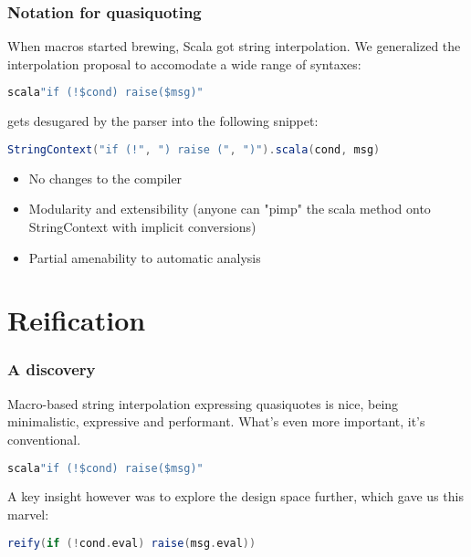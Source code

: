 \documentclass[hyperref={bookmarks=false}]{beamer}
\begin{document}
\begin{frame}[fragile]
\frametitle{Notation for quasiquoting}

When macros started brewing, Scala got string interpolation. We generalized the interpolation proposal to accomodate a wide range of syntaxes:

\begin{lstlisting}[language=scala]
scala"if (!$cond) raise($msg)"
\end{lstlisting}

gets desugared by the parser into the following snippet:

\begin{lstlisting}[language=scala]
StringContext("if (!", ") raise (", ")").scala(cond, msg)
\end{lstlisting}

\begin{itemize}
\item No changes to the compiler
\item Modularity and extensibility (anyone can "pimp" the scala method onto StringContext with implicit conversions)
\item Partial amenability to automatic analysis
\end{itemize}
\end{frame}

\section{Reification}

\begin{frame}[fragile]
\frametitle{A discovery}

Macro-based string interpolation expressing quasiquotes is nice, being minimalistic, expressive and performant. What's even more important, it's conventional.

\begin{lstlisting}[language=scala]
scala"if (!$cond) raise($msg)"
\end{lstlisting}

A key insight however was to explore the design space further, which gave us this marvel:

\begin{lstlisting}[language=scala]
reify(if (!cond.eval) raise(msg.eval))
\end{lstlisting}
\end{frame}
\end{document}
